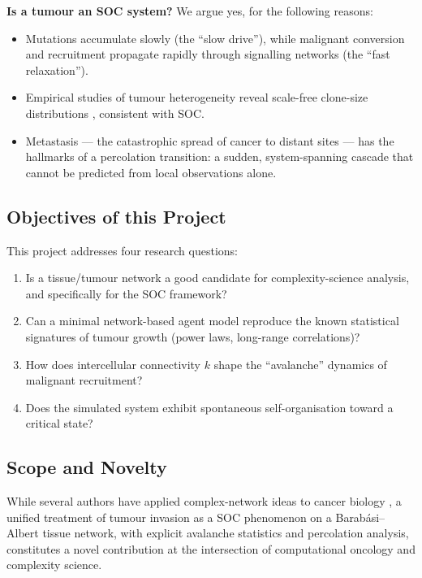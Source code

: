 \documentclass[12pt,a4paper]{article}
\begin{document}
\textbf{Is a tumour an SOC system?}  We argue yes, for the following reasons:
\begin{itemize}[leftmargin=1.5em]
  \item Mutations accumulate slowly (the ``slow drive''), while malignant
        conversion and recruitment propagate rapidly through signalling networks
        (the ``fast relaxation'').
  \item Empirical studies of tumour heterogeneity reveal scale-free clone-size
        distributions \citep{sottoriva2015big}, consistent with SOC.
  \item Metastasis --- the catastrophic spread of cancer to distant sites ---
        has the hallmarks of a percolation transition: a sudden, system-spanning
        cascade that cannot be predicted from local observations alone.
\end{itemize}

\subsection{Objectives of this Project}

This project addresses four research questions:
\begin{enumerate}[leftmargin=1.5em]
  \item Is a tissue/tumour network a good candidate for complexity-science
        analysis, and specifically for the SOC framework?
  \item Can a minimal network-based agent model reproduce the known statistical
        signatures of tumour growth (power laws, long-range correlations)?
  \item How does intercellular connectivity $k$ shape the ``avalanche'' dynamics
        of malignant recruitment?
  \item Does the simulated system exhibit spontaneous self-organisation toward a
        critical state?
\end{enumerate}

\subsection{Scope and Novelty}

While several authors have applied complex-network ideas to cancer biology
\citep{barabasi2011network, hanahan2011hallmarks}, a unified treatment of
tumour invasion as a SOC phenomenon on a Barab\'{a}si--Albert tissue network,
with explicit avalanche statistics and percolation analysis, constitutes a
novel contribution at the intersection of computational oncology and
complexity science.
\end{document}
